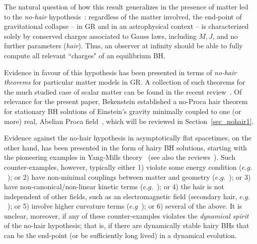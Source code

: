 The natural question of how this result generalizes in the presence of matter led to the \textit{no-hair} hypothesis~\cite{Ruffini:1971bza}: regardless of the matter involved, the end-point of gravitational collapse -- in GR and in an astrophysical context -- is characterized solely by conserved charges associated to Gauss laws, including $M,J$, and no further parameters (\textit{hair}). Thus, an observer at infinity should be able to fully compute all relevant ``charges" of an equilibrium BH.

Evidence in favour of this hypothesis has been presented in terms of \textit{no-hair theorems} for particular matter models in GR. A collection of such theorems for the much studied case of scalar matter can be found in the recent review~\cite{Herdeiro:2015waa}. Of relevance for the present paper, Bekenstein established a no-Proca hair theorem for stationary BH solutions of Einstein's gravity minimally coupled to one (or more) real, Abelian Proca field~\cite{Bekenstein:1971hc,Bekenstein:1972ky}, which will be reviewed in Section~\ref{sec_nohair1}. 



Evidence against the no-hair hypothesis in asymptotically flat spacetimes, on the other hand, has been presented in the form of hairy BH solutions, starting with the pioneering examples in Yang-Mills theory~\cite{Volkov:1998cc} (see also the reviews~\cite{Bizon:1994dh,Bekenstein:1996pn,Herdeiro:2015waa,Volkov:2016ehx}). 
Such counter-examples, however, typically either 
1) violate some energy condition ($e.g.$~\cite{Nucamendi:1995ex,Bechmann:1995sa,Anabalon:2013qua,Anabalon:2012ih,Cadoni:2015gfa}); or 
2) have non-minimal couplings between matter and geometry ($e.g.$~\cite{Bekenstein:1975ts,Bekenstein:1974sf,BBM,Sotiriou:2014pfa,Sotiriou:2013qea,Babichev:2013cya}); or 
3) have non-canonical/non-linear kinetic terms ($e.g.$~\cite{Luckock:1986tr,Luckock,Bronnikov:2005gm,Radu:2011uj}); or 
4) the hair is not independent of other fields, such as an electromagnetic field (secondary hair, $e.g.$~\cite{Gibbons:1987ps,Gibbons:1982ih}); or 
5) involve higher curvature terms 
($e.g$~\cite{Kanti:1995vq,Ayzenberg:2014aka,Kleihaus:2011tg,Kleihaus:2015aje,Pani:2011gy,Pani:2009wy,Alexander:2009tp,Yunes:2009hc}); or 
6) several of the above. It is unclear, moreover, if any of these counter-examples violates the \textit{dynamical spirit} of the no-hair hypothesis; that is, if there are dynamically stable hairy BHs that can be the end-point (or be sufficiently long lived) in a dynamical evolution.

